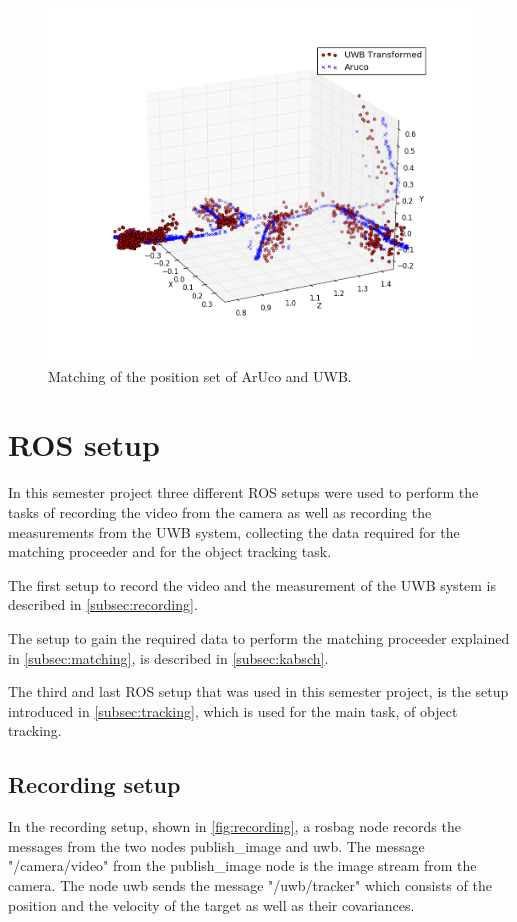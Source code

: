 \begin{figure}[ht!]\centering
	\includegraphics[width=1.0\textwidth]{figures/matching}
	\caption{Matching of the position set of ArUco and UWB.}\label{fig:matching}
\end{figure} 

\section{ROS setup}
In this semester project three different ROS setups were used to perform the tasks of recording the video from the camera as well as recording the measurements from the UWB system, collecting the data required for the matching proceeder and for the object tracking task.

The first setup to record the video and the measurement of the UWB system is described in \autoref{subsec:recording}.

The setup to gain the required data to perform the matching proceeder explained in \autoref{subsec:matching}, is described in \autoref{subsec:kabsch}.

The third and last ROS setup that was used in this semester project, is the setup introduced in \autoref{subsec:tracking}, which is used for the main task, of object tracking.

\subsection{Recording setup}\label{subsec:recording}
In the recording setup, shown in \autoref{fig:recording}, a rosbag node records the messages from the two nodes publish\_image and uwb. The message "/camera/video" from the publish\_image node is the image stream from the camera. The node uwb sends the message "/uwb/tracker" which consists of the position and the velocity of the target as well as their covariances.

